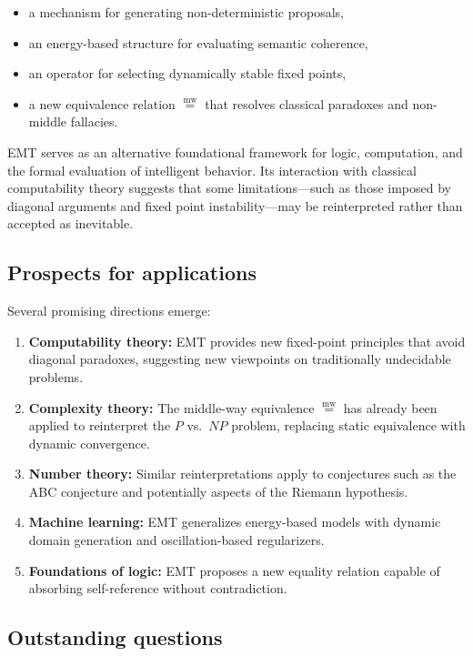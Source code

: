 \documentclass[11pt]{article}
\newcommand{\mweq}{\mathrel{\overset{\mathrm{mw}}{=}}}
\theoremstyle{definition}
\theoremstyle{remark}
\begin{document}
\begin{itemize}
  \item a mechanism for generating non-deterministic proposals,
  \item an energy-based structure for evaluating semantic coherence,
  \item an operator for selecting dynamically stable fixed points,
  \item a new equivalence relation $\mweq$ that resolves classical
        paradoxes and non-middle fallacies.
\end{itemize}

EMT serves as an alternative foundational framework for logic,
computation, and the formal evaluation of intelligent behavior. Its
interaction with classical computability theory suggests that some
limitations---such as those imposed by diagonal arguments and fixed
point instability---may be reinterpreted rather than accepted as
inevitable.

\subsection{Prospects for applications}

Several promising directions emerge:

\begin{enumerate}
  \item \textbf{Computability theory:}
        EMT provides new fixed-point principles that avoid diagonal
        paradoxes, suggesting new viewpoints on traditionally
        undecidable problems.
  \item \textbf{Complexity theory:}
        The middle-way equivalence $\mweq$ has already been applied to
        reinterpret the $P$ vs.\ $NP$ problem, replacing static
        equivalence with dynamic convergence.
  \item \textbf{Number theory:}
        Similar reinterpretations apply to conjectures such as the
        ABC conjecture and potentially aspects of the Riemann
        hypothesis.
  \item \textbf{Machine learning:}
        EMT generalizes energy-based models with dynamic domain
        generation and oscillation-based regularizers.
  \item \textbf{Foundations of logic:}
        EMT proposes a new equality relation capable of absorbing
        self-reference without contradiction.
\end{enumerate}

\subsection{Outstanding questions}
\end{document}
